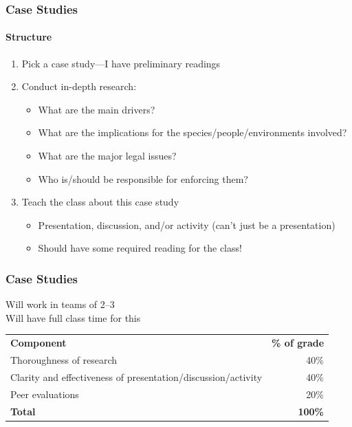 \documentclass[10pt]{beamer}
\begin{document}
\begin{frame}[t]
\frametitle{Case Studies}
\framesubtitle{Structure}
\vspace{0.5cm}

	\begin{enumerate}
		\item Pick a case study---I have preliminary readings
		\medskip
		\item Conduct in-depth research:
			\begin{itemize}
				\item What are the main drivers?
				\item What are the implications for the species/people/environments involved?
				\item What are the major legal issues?
				\item Who is/should be responsible for enforcing them?
			\end{itemize}
		\medskip
		\item Teach the class about this case study
			\begin{itemize}
				\item Presentation, discussion, and/or activity (\textcolor{myblue}{can't just be a presentation})
				\item Should have some \textcolor{myblue}{required reading} for the class!
			\end{itemize}	
	\end{enumerate}
\end{frame}


\begin{frame}[t]
\frametitle{Case Studies}
\vspace{0.5cm}

	Will work in teams of 2--3\\
	\vspace{0.5cm}
	Will have full class time for this\\
	\vspace{0.5cm}

	\begin{center}
		\begin{tabular}{p{6cm} r}
			\toprule
			\textbf{Component} & \textbf{\% of grade}\\
			\addlinespace
			\midrule
			Thoroughness of research & 40\%\\
			\addlinespace
			Clarity and effectiveness of presentation/discussion/activity & 40\%\\
			\addlinespace
			Peer evaluations & 20\%\\
			\midrule
			\textbf{Total} & \textbf{100\%}\\
			\bottomrule
		\end{tabular}
	\end{center}
\end{frame}
\end{document}
